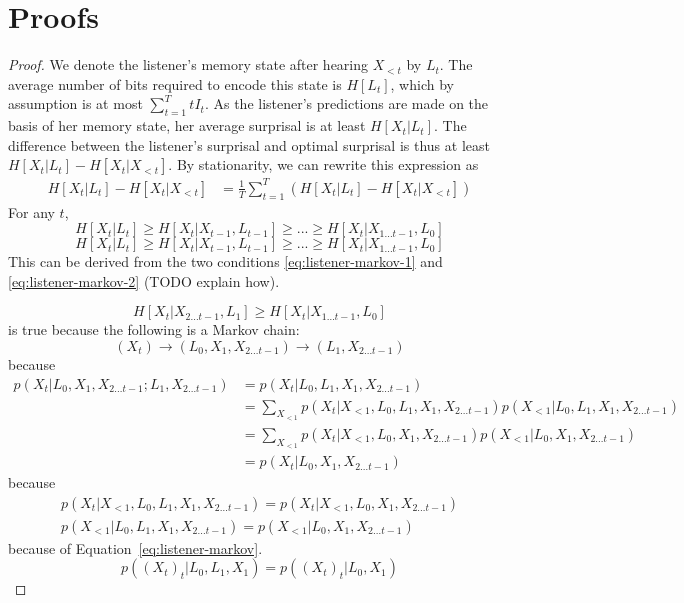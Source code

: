 \documentclass[11pt,letterpaper]{article}
\begin{document}
\section{Proofs}



\begin{proof}
We denote the listener's memory state after hearing $X_{<t}$ by $L_t$.
The average number of bits required to encode this state is $H[L_t]$, which by assumption is at most $\sum_{t=1}^T t I_t$.
As the listener's predictions are made on the basis of her memory state, her average surprisal is at least $H[X_t | L_t]$.
The difference between the listener's surprisal and optimal surprisal is thus at least $H[X_t | L_t] - H[X_t | X_{<t}]$.
By stationarity, we can rewrite this expression as
\begin{align*}
	H[X_t | L_t] - H[X_t | X_{<t}] &=  \frac{1}{T} \sum_{t=1}^{T} \left(H[X_t | L_t] - H[X_t | X_{<t}]\right) 
\end{align*}
For any $t$,
	$$H[X_t | L_t] \geq H[X_t| X_{t-1}, L_{t-1}] \geq ... \geq H[X_t|X_{1 \dots t-1}, L_0]$$
	\begin{equation}
H[X_t | L_t] \geq H[X_t| X_{t-1}, L_{t-1}] \geq ... \geq H[X_t|X_{1 \dots t-1}, L_0]
		\end{equation}
	This can be derived from the two conditions \ref{eq:listener-markov-1} and \ref{eq:listener-markov-2} (TODO explain how).

	\begin{equation}
H[X_t| X_{2 \dots t-1}, L_{1}] \geq H[X_t|X_{1 \dots t-1}, L_0]
	\end{equation}
is true because the following is a Markov chain:
\begin{equation}
(X_t) \rightarrow (L_0, X_1, X_{2 \dots t-1})   \rightarrow   (L_1, X_{2 \dots t-1})
\end{equation}
because
\begin{align*}
p(X_t|L_0, X_1, X_{2 \dots t-1}; L_1, X_{2 \dots t-1}) & = p(X_t|L_0, L_1, X_1, X_{2 \dots t-1}) \\
& = \sum_{X_{<1}} p(X_t|X_{<1}, L_0, L_1, X_1, X_{2 \dots t-1}) p(X_{<1}| L_0, L_1, X_1, X_{2 \dots t-1}) \\
&= \sum_{X_{<1}} p(X_t|X_{<1}, L_0,  X_1, X_{2 \dots t-1}) p(X_{<1}| L_0, X_1, X_{2 \dots t-1}) \\
&= p(X_t|L_0,  X_1, X_{2 \dots t-1}) 
\end{align*}
because
	\begin{align*}
p(X_t|X_{<1}, L_0, L_1, X_1, X_{2 \dots t-1}) = p(X_t|X_{<1}, L_0,  X_1, X_{2 \dots t-1}) \\
p(X_{<1}| L_0, L_1, X_1, X_{2 \dots t-1})   = p(X_{<1}| L_0, X_1, X_{2 \dots t-1})
	\end{align*}
because of Equation~\ref{eq:listener-markov}.
	\begin{equation}
p((X_{t})_t| L_0, L_1, X_1)   = p((X_{t})_t| L_0, X_1)
	\end{equation}


\end{proof}
\end{document}
